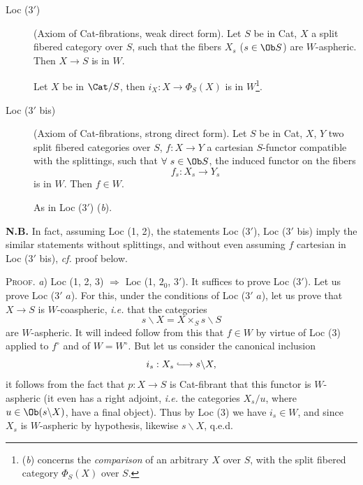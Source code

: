 
\begin{description}
\item[Loc (3$'$)]  (Axiom of Cat-fibrations, weak direct form). Let $S$ be in Cat, $X$ a split fibered category over $S$, such that the fibers $X_s$ ($s \in \Ob S$) are $W$-aspheric. Then $X \longrightarrow S$ is in $W$.

 Let $X$ be in $\Cat/S$, then $i_X : X \longrightarrow \Phi_S(X)$ is in $W$\footnote[2]{(\textit{b}) concerns the \textit{comparison} of an arbitrary $X$ over $S$, with the split fibered category $\Phi_S(X)$ over $S$.}. %
\end{description}

\clearpage


\begin{description}
\item[Loc (3$'$ bis)]  (Axiom of Cat-fibrations, strong direct form). Let $S$ be in Cat, $X$, $Y$ two split fibered categories over $S$, $f : X \longrightarrow Y$ a cartesian $S$-functor compatible with the splittings, such that $\forall\ s \in \Ob S$, the induced functor on the fibers
\[
f_s : X_s \longrightarrow Y_s
\]
is in $W$. Then $f \in W$.

 As in Loc ($3'$) (\textit{b}).
\end{description}

\textbf{N.B.} In fact, assuming Loc (1, 2), the statements Loc ($3'$), Loc ($3'$ bis) imply the similar statements without splittings, and without even assuming $f$ cartesian in Loc ($3'$ bis), \textit{cf.} proof below.

\textsc{Proof.} \textit{a}) Loc (1, 2, 3) $\Longrightarrow$ Loc (1, $2_0$, $3'$). It suffices to prove Loc ($3'$). Let us prove Loc ($3'$ $a$). For this, under the conditions of Loc ($3'$ $a$), let us prove that $X \longrightarrow S$ is $W$-coaspheric, \textit{i.e.} that the categories
\[
s\backslash X = X \times_S s\backslash S
\]
are $W$-aspheric. It will indeed follow from this that $f \in W$ by virtue of Loc (3) applied to $f^\circ$ and of $W = W^\circ$. But
let us consider the canonical inclusion
\[
i_s : X_s \lhook\joinrel\longrightarrow s\backslash X,
\]
it follows from the fact that $p : X \longrightarrow S$ is Cat-fibrant that this functor is $W$-aspheric (it even has a right adjoint, \textit{i.e.} the categories $X_s/u$, where $u \in \Ob(s\backslash X)$, have a final object). Thus by Loc (3) we have $i_s \in W$, and since $X_s$ is $W$-aspheric by hypothesis, likewise $s\backslash X$, q.e.d.

